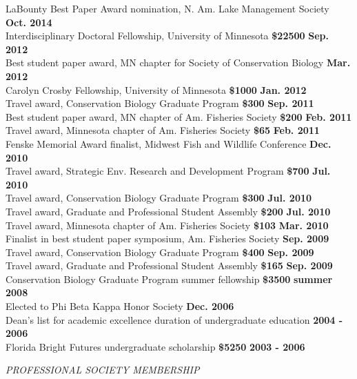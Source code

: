 \documentclass[letterpaper,12pt]{article}
\newcommand{\sectitle}[1]{\vspace{\baselineskip} \centerline{\large{\textit{#1}}}}
\begin{document}
LaBounty Best Paper Award nomination, N. Am. Lake Management Society \hfill {\bf Oct. 2014} \\
Interdisciplinary Doctoral Fellowship, University of Minnesota {\bf \$22500} \hfill {\bf Sep. 2012} \\
Best student paper award, MN chapter for Society of Conservation Biology \hfill {\bf Mar. 2012} \\
Carolyn Crosby Fellowship, University of Minnesota {\bf \$1000} \hfill {\bf Jan. 2012} \\
Travel award, Conservation Biology Graduate Program {\bf \$300} \hfill {\bf Sep. 2011} \\
Best student paper award, MN chapter of Am. Fisheries Society {\bf \$200} \hfill {\bf Feb. 2011} \\
Travel award, Minnesota chapter of Am. Fisheries Society {\bf \$65} \hfill {\bf Feb. 2011} \\
Fenske Memorial Award finalist, Midwest Fish and Wildlife Conference \hfill {\bf Dec. 2010} \\
Travel award, Strategic Env. Research and Development Program {\bf \$700} \hfill {\bf Jul. 2010} \\
Travel award, Conservation Biology Graduate Program {\bf \$300} \hfill {\bf Jul. 2010} \\
Travel award, Graduate and Professional Student Assembly {\bf \$200} \hfill {\bf Jul. 2010} \\
Travel award, Minnesota chapter of Am. Fisheries Society {\bf \$103} \hfill {\bf Mar. 2010} \\
Finalist in best student paper symposium, Am. Fisheries Society \hfill {\bf Sep. 2009} \\
Travel award, Conservation Biology Graduate Program {\bf \$400} \hfill {\bf Sep. 2009} \\
Travel award, Graduate and Professional Student Assembly {\bf \$165} \hfill {\bf Sep. 2009} \\
Conservation Biology Graduate Program summer fellowship {\bf \$3500} \hfill {\bf summer 2008} \\
Elected to Phi Beta Kappa Honor Society \hfill {\bf Dec. 2006} \\
Dean's list for academic excellence duration of undergraduate education \hfill {\bf 2004 - 2006} \\
Florida Bright Futures undergraduate scholarship {\bf \$5250} \hfill {\bf 2003 - 2006} 

\sectitle{PROFESSIONAL SOCIETY MEMBERSHIP}
\end{document}
